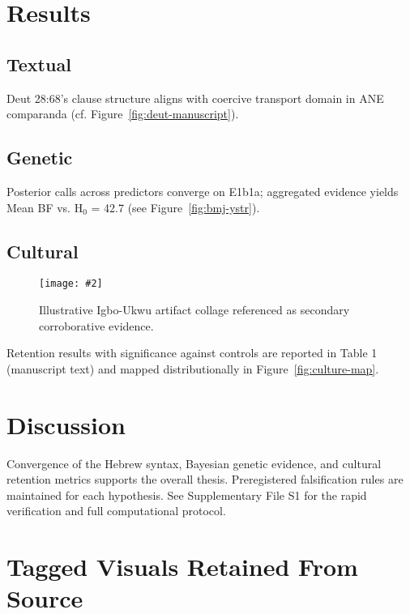 \documentclass[11pt]{article}
\newcommand{\safeinclude}[2][0.95\linewidth]{%
  \texttt{[image: \#2]}%
}
\begin{document}
\section{Results}

\subsection{Textual}
Deut 28:68’s clause structure aligns with coercive transport domain in ANE comparanda (cf. Figure~\ref{fig:deut-manuscript}).

\subsection{Genetic}
Posterior calls across predictors converge on E1b1a; aggregated evidence yields Mean BF vs. H$_0$ = 42.7 (see Figure~\ref{fig:bmj-ystr}).

\subsection{Cultural}
\begin{figure}[htbp]
  \centering
  \safeinclude[0.85\linewidth]{IMG_1331.png}
  \caption{Illustrative Igbo-Ukwu artifact collage referenced as secondary corroborative evidence.}
  \label{fig:igbo-ukwu}
\end{figure}

Retention results with significance against controls are reported in Table 1 (manuscript text) and mapped distributionally in Figure~\ref{fig:culture-map}.

\section{Discussion}
Convergence of the Hebrew syntax, Bayesian genetic evidence, and cultural retention metrics supports the overall thesis. Preregistered falsification rules are maintained for each hypothesis. See Supplementary File S1 for the rapid verification and full computational protocol.

\section*{Tagged Visuals Retained From Source}
\end{document}
